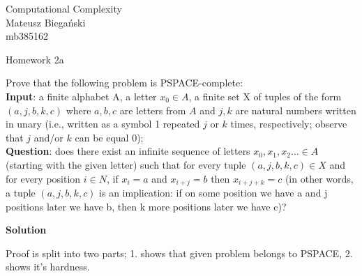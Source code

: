 \documentclass[12pt]{article}
\begin{document}

\begin{flushright}
    Computational Complexity \\
    Mateusz Biegański \\ 
    mb385162
\end{flushright}

\begin{center}
    \Large Homework 2a \normalsize
\end{center}

Prove that the following problem is PSPACE-complete:\\
\textbf{Input}: a finite alphabet A, a letter $x_0 \in A$, a finite set X of tuples of the form $(a,j,b,k,c)$ where
$a,b,c$ are letters from $A$ and $j,k$ are natural numbers written in unary (i.e., written as a symbol
1 repeated $j$ or $k$ times, respectively; observe that $j$ and/or $k$ can be equal 0);\\
\textbf{Question}: does there exist an infinite sequence of letters $x_0,x_1,x_2\dots \in A$ (starting with the
given letter) such that for every tuple $(a,j,b,k,c) \in X$ and for every position $i \in N$, if $x_i = a$
and $x_{i+j} = b$ then $x_{i+j+k} = c$ (in other words, a tuple $(a,j,b,k,c)$ is an implication: if on some
position we have a and j positions later we have b, then k more positions later we have c)?


{\bf Solution}

Proof is split into two parts;   1. shows that given problem belongs to PSPACE,
2. shows it's hardness.
\end{document}
